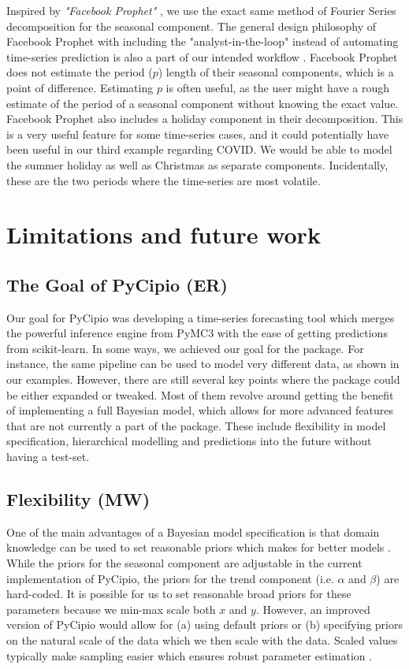 \documentclass{article}
\begin{document}
\noindent Inspired by \textit{"Facebook Prophet"} \cite{taylor2018forecasting}, we use the exact same method of Fourier Series decomposition for the seasonal component. The general design philosophy of Facebook Prophet with including the "analyst-in-the-loop" instead of automating time-series prediction is also a part of our intended workflow \cite{taylor2018forecasting}. 
Facebook Prophet does not estimate the period ($p$) length of their seasonal components, which is a point of difference. Estimating $p$ is often useful, as the user might have a rough estimate of the period of a seasonal component without knowing the exact value. Facebook Prophet also includes a holiday component in their decomposition. This is a very useful feature for some time-series cases, and it could potentially have been useful in our third example regarding COVID. We would be able to model the summer holiday as well as Christmas as separate components. Incidentally, these are the two periods where the time-series are most volatile.

\section{Limitations and future work}

\subsection{The Goal of PyCipio (ER)}

\noindent Our goal for PyCipio was developing a time-series forecasting tool which merges the powerful inference engine from PyMC3 with the ease of getting predictions from scikit-learn. In some ways, we achieved our goal for the package. For instance, the same pipeline can be used to model very different data, as shown in our examples. However, there are still several key points where the package could be either expanded or tweaked. Most of them revolve around getting the benefit of implementing a full Bayesian model, which allows for more advanced features that are not currently a part of the package. These include flexibility in model specification, hierarchical modelling and predictions into the future without having a test-set. 

\subsection{Flexibility (MW)}

\noindent One of the main advantages of a Bayesian model specification is that domain knowledge can be used to set reasonable priors which makes for better models \cite{McElreath}. While the priors for the seasonal component are adjustable in the current implementation of PyCipio, the priors for the trend component (i.e. $\alpha$ and $\beta$) are hard-coded. It is possible for us to set reasonable broad priors for these parameters because we min-max scale both $x$ and $y$. However, an improved version of PyCipio would allow for (a) using default priors or (b) specifying priors on the natural scale of the data which we then scale with the data. Scaled values typically make sampling easier which ensures robust parameter estimation \cite{Min-Max}.
\end{document}
